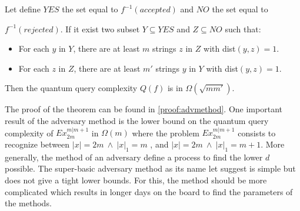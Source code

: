 \begin{theorem}
    Let define $YES$ the set equal to $f^{-1}(accepted)$ and $NO$ the set
    equal to

    $f^{-1}(rejected)$. If it exist two subset $Y\subseteq YES$ and
    $Z \subseteq NO$ such that:
    \begin{itemize}
        \item For each $y$ in $Y$, there are at least $m$ strings $z$ in $Z$ with dist$(y,z)=1$.
        \item For each $z$ in $Z$, there are at least $m'$ strings $y$ in $Y$ with dist$(y,z)=1$.
    \end{itemize}
    Then the quantum query complexity $Q(f)$ is in  $\Omega(\sqrt{m m'})$.
\end{theorem}


The proof of the theorem can be found in \autoref{proof:advmethod}.
One important result of the adversary method is the lower bound on the quantum query complexity
of $Ex_{2m}^{m \vert m+1}$
in $\Omega\left(m\right)$ where the problem $Ex_{2m}^{m\vert m+1}$ consists to
recognize between $|x|=2m\ \land\ |x|_1 = m$ , and $|x|=2m\ \land\ |x|_1 = m+1$.
More generally, the method of an adversary define a process to find the lower $d$ possible. The
super-basic adversary method as its name let suggest is simple but does not give
a tight lower bounds. For this, the method should be more complicated which results
in longer days on the board to find the parameters of the methods.

